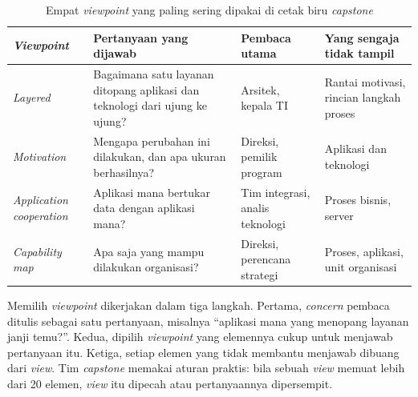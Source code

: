 \begin{table}[!htb]
  \centering
  \caption{Empat \textit{viewpoint} yang paling sering dipakai di cetak biru
           \textit{capstone}}
  \label{tab:ch04-viewpoint}
  \small
  \begin{tabularx}{\textwidth}{>{\raggedright\arraybackslash}p{2.3cm}>{\raggedright\arraybackslash}X>{\raggedright\arraybackslash}p{2.1cm}>{\raggedright\arraybackslash}X}
    \hline
    \textbf{\textit{Viewpoint}} & \textbf{Pertanyaan yang dijawab} & \textbf{Pembaca utama} & \textbf{Yang sengaja tidak tampil} \\
    \hline
    \textit{Layered} & Bagaimana satu layanan ditopang aplikasi dan teknologi dari ujung ke ujung? & Arsitek, kepala TI & Rantai motivasi, rincian langkah proses \\
    \hline
    \textit{Motivation} & Mengapa perubahan ini dilakukan, dan apa ukuran berhasilnya? & Direksi, pemilik program & Aplikasi dan teknologi \\
    \hline
    \textit{Application cooperation} & Aplikasi mana bertukar data dengan aplikasi mana? & Tim integrasi, analis teknologi & Proses bisnis, server \\
    \hline
    \textit{Capability map} & Apa saja yang mampu dilakukan organisasi? & Direksi, perencana strategi & Proses, aplikasi, unit organisasi \\
    \hline
  \end{tabularx}
\end{table}

Memilih \textit{viewpoint} dikerjakan dalam tiga langkah. Pertama,
\textit{concern} pembaca ditulis sebagai satu pertanyaan, misalnya ``aplikasi
mana yang menopang layanan janji temu?''. Kedua, dipilih
\textit{viewpoint} yang elemennya cukup untuk menjawab pertanyaan itu. Ketiga,
setiap elemen yang tidak membantu menjawab dibuang dari \textit{view}. Tim
\textit{capstone} memakai aturan praktis: bila sebuah \textit{view} memuat
lebih dari 20 elemen, \textit{view} itu dipecah atau pertanyaannya
dipersempit.

